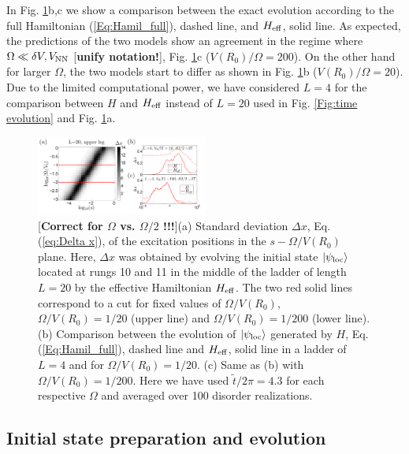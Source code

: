 \documentclass[prl,aps,twocolumn,showpacs,superscriptaddress,longbibliography]{revtex4-1}
\newcommand{\ran}{\right\rangle}
\newcommand{\ket}[1]{\left| #1 \ran}
\begin{document}
In Fig. \ref{Fig:Dx_scan}b,c we show a comparison between the exact evolution according to the full Hamiltonian (\ref{Eq:Hamil_full}), dashed line, and $H_{\rm eff}$, solid line. As expected, the predictions of the two models show an agreement in the regime where $\Omega \ll \delta V, V_{\rm NN}$ [{\bf unify notation!}], Fig. \ref{Fig:Dx_scan}c ($V(R_0)/\Omega=200$). On the other hand for larger $\Omega$, the two models start to differ as shown in Fig. \ref{Fig:Dx_scan}b ($V(R_0)/\Omega=20$). Due to the limited computational power, we have considered $L=4$ for the comparison between $H$ and $H_{\rm eff}$ instead of $L=20$ used in Fig. \ref{Fig:time evolution} and Fig. \ref{Fig:Dx_scan}a.


\begin{figure}

	      \includegraphics[width=0.5\textwidth]{graphics/Dx_vs_s_Omega.pdf}
		\caption{[{\bf Correct for $\Omega$ vs. $\Omega/2$ !!!}](a) Standard deviation $\Delta x$, Eq. (\ref{eq:Delta x}), of the excitation positions in the $s-\Omega/V(R_0)$ plane. Here, $\Delta x$ was obtained by evolving the initial state $\ket{\psi_{\rm loc}}$ located at rungs 10 and 11 in the middle of the ladder of length $L=20$ by the effective Hamiltonian $H_{\rm eff}$. The two red solid lines correspond to a cut for fixed values of $\Omega/V(R_0)$, $\Omega/V(R_0)=1/20$ (upper line) and $\Omega/V(R_0)=1/200$ (lower line). (b) Comparison between the evolution of $\ket{\psi_{\rm loc}}$ generated by $H$, Eq. (\ref{Eq:Hamil_full}), dashed line and $H_{\rm eff}$, solid line in a ladder of $L=4$ and for $\Omega/V(R_0)=1/20$. (c) Same as (b) with $\Omega/V(R_0)=1/200$. Here we have used $\tilde{t}/2 \pi = 4.3$ for each respective $\Omega$ and averaged over 100 disorder realizations. 
		}
 \label{Fig:Dx_scan}
   
\end{figure}  


\subsection{Initial state preparation and evolution}
\end{document}

